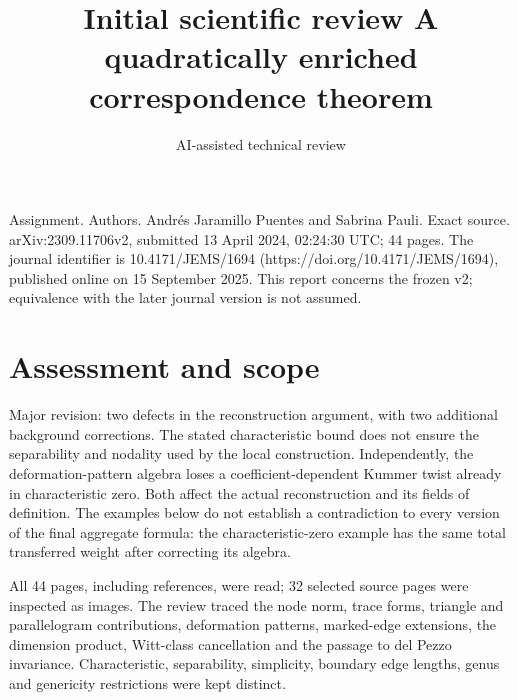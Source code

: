 \documentclass[10pt]{article}
\title{Initial scientific review
A quadratically enriched correspondence theorem}
\author{AI-assisted technical review}
\date{}
\begin{document}
\maketitle
Assignment. Authors. Andrés Jaramillo Puentes and Sabrina Pauli. Exact source. arXiv:2309.11706v2, submitted 13 April 2024, 02:24:30 UTC; 44 pages. The journal identifier is 10.4171/JEMS/1694 (https://doi.org/10.4171/JEMS/1694), published online on 15 September 2025. This report concerns the frozen v2; equivalence with the later journal version is not assumed.\par
\section*{Assessment and scope}
Major revision: two defects in the reconstruction argument, with two additional background corrections. The stated characteristic bound does not ensure the separability and nodality used by the local construction. Independently, the deformation-pattern algebra loses a coefficient-dependent Kummer twist already in characteristic zero. Both affect the actual reconstruction and its fields of definition. The examples below do not establish a contradiction to every version of the final aggregate formula: the characteristic-zero example has the same total transferred weight after correcting its algebra.\par
All 44 pages, including references, were read; 32 selected source pages were inspected as images. The review traced the node norm, trace forms, triangle and parallelogram contributions, deformation patterns, marked-edge extensions, the dimension product, Witt-class cancellation and the passage to del Pezzo invariance. Characteristic, separability, simplicity, boundary edge lengths, genus and genericity restrictions were kept distinct.\par
\end{document}
